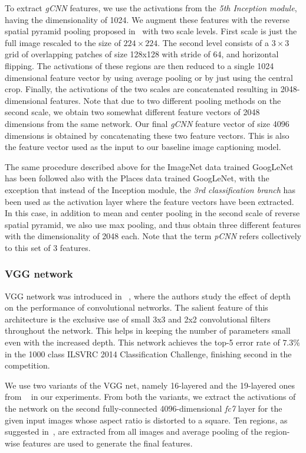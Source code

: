 To extract \emph{gCNN} features, we use the activations from the
\emph{5th Inception module}, having the dimensionality of 1024.
We augment these features with the reverse spatial pyramid pooling proposed
in~\cite{Gong2014} with two scale levels.
First scale is just the full image rescaled to the size of $224\times224$.
The second level consists of a $3\times3$ grid of overlapping patches of size
128x128 with stride of 64, and horizontal flipping.
The activations of these regions are then reduced to a single 1024 dimensional
feature vector by using average pooling or by just using the central crop.
Finally, the activations of the two scales are concatenated resulting in
2048-dimensional features.
Note that due to two different pooling methods on the second scale, we obtain
two somewhat different feature vectors of 2048 dimensions from the same network.
Our final \emph{gCNN} feature vector of size 4096 dimensions is obtained by
concatenating these two feature vectors.
This is also the feature vector used as the input to our baseline image
captioning model. 

The same procedure described above for the ImageNet data trained GoogLeNet has
been followed also with the Places data trained GoogLeNet, with the exception
that instead of the Inception module, the \emph{3rd classification branch} has
been used as the activation layer where the feature vectors have been extracted.
In this case, in addition to mean and center pooling in the second scale of
reverse spatial pyramid, we also use max pooling, and thus obtain three
different features with the dimensionality of 2048 each.
Note that the term \emph{pCNN} refers collectively to this set of 3 features.

\subsubsection{VGG network} 
VGG network was introduced in ~\cite{Simonyan14c}, where the authors study the
effect of depth on the performance of convolutional networks.
The salient feature of this architecture is the exclusive use of small 3x3 and
2x2 convolutional filters throughout the network.
This helps in keeping the number of parameters small even with the increased depth.
This network achieves the top-5 error rate of $7.3\%$ in the 1000 class ILSVRC
2014 Classification Challenge, finishing second in the competition.

We use two variants of the VGG net, namely 16-layered and the 19-layered ones
from ~\cite{Simonyan14c} in our experiments.
From both the variants, we extract the activations of the network on the second
fully-connected 4096-dimensional \emph{fc7} layer for the given input images
whose aspect ratio is distorted to a square.
Ten regions, as suggested in~\cite{Krizhevsky2012}, are extracted from all
images and average pooling of the region-wise features are used to generate the
final features.


